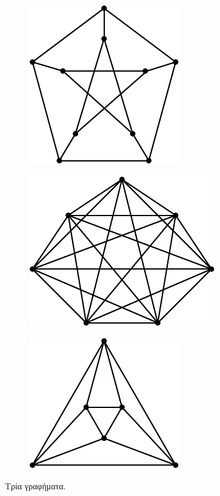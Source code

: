 \begin{figure}[t]
	\centering
	\begin{subfigure}[t]{0.3\textwidth}
		\centering
		\includegraphics[height=0.15\textheight]{Figures/GraphA.pdf}
		\caption{}
		\label{subfig:GraphA}
	\end{subfigure}
	\hfill
	\begin{subfigure}[t]{0.3\textwidth}
		\centering
		\includegraphics[height=0.15\textheight]{Figures/GraphB.pdf}
		\caption{}
		\label{subfig:GraphB}
	\end{subfigure}
	\hfill
	\begin{subfigure}[t]{0.3\textwidth}
		\centering
		\includegraphics[height=0.15\textheight]{Figures/GraphC.pdf}
		\caption{}
		\label{subfig:GraphC}
	\end{subfigure}
	\caption{Τρία γραφήματα.}
	\label{fig:ThreeGraphs}
\end{figure}

